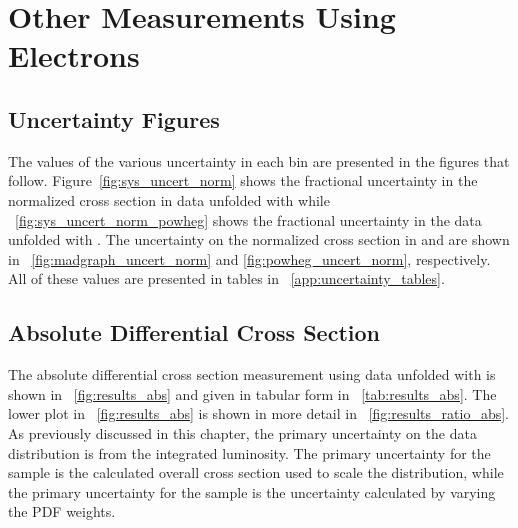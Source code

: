 \chapter{Other Measurements Using \Dressed Electrons}
\label{app:dressed_measurements}

\section{Uncertainty Figures}

The values of the various uncertainty in each \phistar bin are presented in the
figures that follow. Figure~\ref{fig:sys_uncert_norm} shows the fractional
uncertainty in the normalized \phistar cross section in data unfolded with
\MADGRAPH while \FIG~\ref{fig:sys_uncert_norm_powheg} shows the fractional
uncertainty in the data unfolded with \POWHEG. The uncertainty on the
normalized \phistar cross section in \MADGRAPH and \POWHEG are shown in
\FIGS~\ref{fig:madgraph_uncert_norm} and \ref{fig:powheg_uncert_norm},
respectively. All of these values are presented in tables in
\APP~\ref{app:uncertainty_tables}.











\section{Absolute Differential Cross Section}
\label{sec:results_abs}

The absolute differential cross section measurement using data unfolded with
\MADGRAPH is shown in \FIG~\ref{fig:results_abs} and given in tabular form in
\TAB~\ref{tab:results_abs}. The lower plot in \FIG~\ref{fig:results_abs} is
shown in more detail in \FIG~\ref{fig:results_ratio_abs}. As previously
discussed in this chapter, the primary uncertainty on the data distribution is
from the integrated luminosity. The primary uncertainty for the
\MADGRAPH sample is the \FEWZ calculated overall cross section used to scale
the distribution, while the primary uncertainty for the \POWHEG sample is the
uncertainty calculated by varying the \CTten PDF weights.

